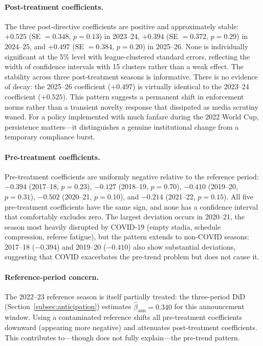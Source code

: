 \paragraph{Post-treatment coefficients.} The three post-directive coefficients are positive and approximately stable: $+0.525$ (SE $= 0.348$, $p = 0.13$) in 2023--24, $+0.394$ (SE $= 0.372$, $p = 0.29$) in 2024--25, and $+0.497$ (SE $= 0.384$, $p = 0.20$) in 2025--26. None is individually significant at the 5\% level with league-clustered standard errors, reflecting the width of confidence intervals with 15 clusters rather than a weak effect. The stability across three post-treatment seasons is informative. There is no evidence of decay: the 2025--26 coefficient ($+0.497$) is virtually identical to the 2023--24 coefficient ($+0.525$). This pattern suggests a permanent shift in enforcement norms rather than a transient novelty response that dissipated as media scrutiny waned. For a policy implemented with much fanfare during the 2022 World Cup, persistence matters---it distinguishes a genuine institutional change from a temporary compliance burst.

\paragraph{Pre-treatment coefficients.} Pre-treatment coefficients are uniformly negative relative to the reference period: $-0.394$ (2017--18, $p = 0.23$), $-0.127$ (2018--19, $p = 0.70$), $-0.410$ (2019--20, $p = 0.31$), $-0.502$ (2020--21, $p = 0.10$), and $-0.214$ (2021--22, $p = 0.15$). All five pre-treatment coefficients have the same sign, and none has a confidence interval that comfortably excludes zero. The largest deviation occurs in 2020--21, the season most heavily disrupted by COVID-19 (empty stadia, schedule compression, referee fatigue), but the pattern extends to non-COVID seasons: 2017--18 ($-0.394$) and 2019--20 ($-0.410$) also show substantial deviations, suggesting that COVID exacerbates the pre-trend problem but does not cause it.

\paragraph{Reference-period concern.} The 2022--23 reference season is itself partially treated: the three-period DiD (Section~\ref{subsec:anticipation}) estimates $\hat{\beta}_{\text{ann}} = 0.340$ for this announcement window. Using a contaminated reference shifts all pre-treatment coefficients downward (appearing more negative) and attenuates post-treatment coefficients. This contributes to---though does not fully explain---the pre-trend pattern.

